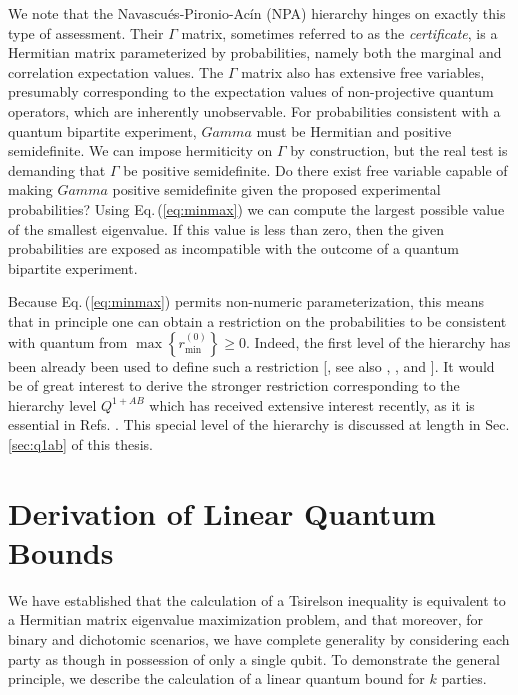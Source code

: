 \documentclass[
  12pt          %
  ,letterpaper  %
  ,center       %
  ,noupper      %
  ,english,fleqn]{uconnthesis}
\let\stdsection\section
\renewcommand\section{\newpage\stdsection}
\newcommand{\ceq}[1]{Eq.\,(\ref{#1})}
\begin{document}
We note that the Navascués-Pironio-Acín (NPA) hierarchy \cite{NPA2007Short,NPA2008Long,NPAReview} hinges on exactly this type of assessment. Their $\Gamma$ matrix, sometimes referred to as the {\em certificate}, is a Hermitian matrix parameterized by probabilities, namely both the marginal and correlation expectation values. The $\Gamma$ matrix also has extensive free variables, presumably corresponding to the expectation values of non-projective quantum operators, which are inherently unobservable. For probabilities consistent with a quantum bipartite experiment, $Gamma$ must be Hermitian and positive semidefinite. We can impose hermiticity on $\Gamma$ by construction, but the real test is demanding that $\Gamma$ be positive semidefinite. Do there exist free variable capable of making $Gamma$ positive semidefinite given the proposed experimental probabilities? Using \ceq{eq:minmax} we can compute the largest possible value of the smallest eigenvalue. If this value is less than zero, then the given probabilities are exposed as incompatible with the outcome of a quantum bipartite experiment.

Because \ceq{eq:minmax} permits non-numeric parameterization, this means that in principle one can obtain a restriction on the probabilities to be consistent with quantum from $\max{\left\{r^{(0)}_{\min{}}\right\}}\geq 0$. Indeed, the first level of the hierarchy has been already been used to define such a restriction [\citealp[Eq. (11)]{NPA2007Short}, see also \citealp[Eq. (11)]{ScaraniML}, \citealp[Eq. (3)]{ICRecovery}, and \citealp[Eq. (9)]{WolfeQB}]. It would be of great interest to derive the stronger restriction corresponding to the hierarchy level $Q^{1+AB}$ which has received extensive interest recently, as it is essential in Refs. \cite{LONatureComm,FritzCombinatorialLong,ConsistentHistoriesContextuality,AlmostQuantum2}. This special level of the hierarchy is discussed at length in Sec. \ref{sec:q1ab} of this thesis.

\section{Derivation of Linear Quantum Bounds}\label{sec:boundderiv}

We have established that the calculation of a Tsirelson inequality \cite{MixedStateQB,PeresBellMaximization99,WernerWolfQB,MinMaxQB,WehnerQB,WolfeQB,LatestTsirelson} is equivalent to a Hermitian matrix eigenvalue maximization problem, and that moreover, for binary and dichotomic scenarios, we have complete generality by considering each party as though in possession of only a single qubit. To demonstrate the general principle, we describe the calculation of a linear quantum bound for $k$ parties. 
\end{document}
